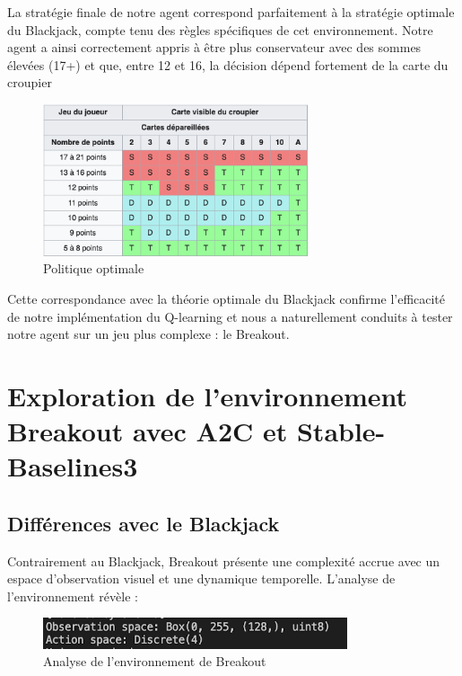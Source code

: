 \documentclass{article}
\begin{document}
\quad La stratégie finale de notre agent correspond parfaitement à la stratégie optimale du Blackjack, compte tenu des règles spécifiques de cet environnement. Notre agent a ainsi correctement appris à être plus conservateur avec des sommes élevées (17+) et que, entre 12 et 16, la décision dépend fortement de la carte du croupier

\begin{figure}[ht]
    \centering
    \includegraphics[width=0.7\textwidth]{4.png}
    \caption{Politique optimale}
\end{figure}

Cette correspondance avec la théorie optimale du Blackjack confirme l’efficacité de notre implémentation du Q-learning et nous a naturellement conduits à tester notre agent sur un jeu plus complexe : le Breakout.

\clearpage

\section{Exploration de l'environnement Breakout avec A2C et Stable-Baselines3}

\subsection{Différences avec le Blackjack}

\quad Contrairement au Blackjack, Breakout présente une complexité accrue avec un espace d'observation visuel et une dynamique temporelle. L'analyse de l'environnement révèle :

\begin{figure}[ht]
    \centering
    \includegraphics[width=0.8\textwidth]{5.png}
    \caption{Analyse de l'environnement de Breakout}
\end{figure}
\end{document}
